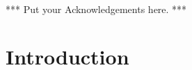\begin{preliminary}

\maketitle



% 





\begin{abstract}

\end{abstract}

\begin{acknowledgements}
***   Put your Acknowledgements here.   ***
\end{acknowledgements}

\begingroup
\hypersetup{linkcolor=black}
\tableofcontents

\listoftables

\listoffigures
\endgroup

\end{preliminary}

\chapter{Introduction}


